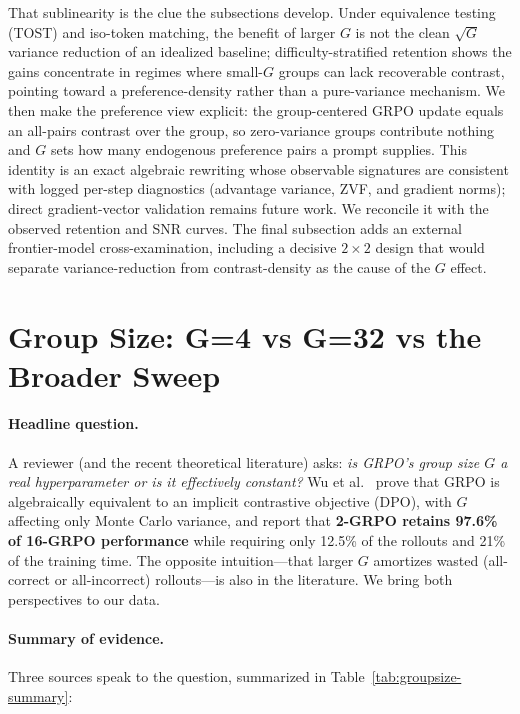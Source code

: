 \documentclass{article}
\begin{document}
That sublinearity is the clue the subsections develop. Under equivalence testing
(TOST) and iso-token matching, the benefit of larger $G$ is not the clean
$\sqrt{G}$ variance reduction of an idealized baseline; difficulty-stratified
retention shows the gains concentrate in regimes where small-$G$ groups can lack
recoverable contrast, pointing toward a preference-density rather than a
pure-variance mechanism. We then
make the preference view explicit: the group-centered GRPO update equals an
all-pairs contrast over the group, so zero-variance groups contribute nothing and
$G$ sets how many endogenous preference pairs a prompt supplies. This identity is
an exact algebraic rewriting whose observable signatures are consistent with
logged per-step diagnostics (advantage variance, ZVF, and gradient norms);
direct gradient-vector validation remains future work. We reconcile it with the
observed retention and SNR curves. The final subsection adds an external frontier-model
cross-examination, including a decisive $2{\times}2$ design that would separate
variance-reduction from contrast-density as the cause of the $G$ effect.
 \section{Group Size: G=4 vs G=32 vs the Broader Sweep}
\label{sec:group-size}

\paragraph{Headline question.}
A reviewer (and the recent theoretical literature) asks: \emph{is GRPO's
group size $G$ a real hyperparameter or is it effectively constant?}
Wu et al.~\cite{wu2025grpo_dpo} prove that GRPO is algebraically
equivalent to an implicit contrastive objective (DPO), with $G$ affecting
only Monte Carlo variance, and report that \textbf{2-GRPO retains
97.6\% of 16-GRPO performance} while requiring only 12.5\% of the
rollouts and 21\% of the training time. The opposite intuition---that
larger $G$ amortizes wasted (all-correct or all-incorrect) rollouts---is
also in the literature. We bring both perspectives to our data.

\paragraph{Summary of evidence.}
Three sources speak to the question, summarized in
Table~\ref{tab:groupsize-summary}:
\end{document}
